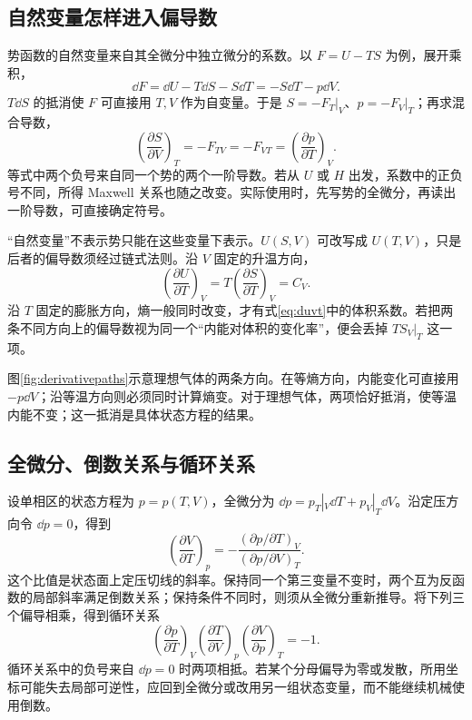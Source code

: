 \subsection{自然变量怎样进入偏导数}
\label{th:naturalderivatives}
势函数的自然变量来自其全微分中独立微分的系数。以 $F=U-TS$ 为例，展开乘积，
\[
 \dd F=\dd U-T\dd S-S\dd T
 =-S\dd T-p\dd V.
\]
$T\dd S$ 的抵消使 $F$ 可直接用 $T,V$ 作为自变量。于是
$S=-F_T|_V$、$p=-F_V|_T$；再求混合导数，
\[
 \left(\frac{\partial S}{\partial V}\right)_T
 =-F_{TV}
 =-F_{VT}
 =\left(\frac{\partial p}{\partial T}\right)_V.
\]
等式中两个负号来自同一个势的两个一阶导数。若从 $U$ 或 $H$ 出发，系数中的正负号不同，所得 Maxwell 关系也随之改变。实际使用时，先写势的全微分，再读出一阶导数，可直接确定符号。

“自然变量”不表示势只能在这些变量下表示。$U(S,V)$ 可改写成 $U(T,V)$，只是后者的偏导数须经过链式法则。沿 $V$ 固定的升温方向，
\[
 \left(\frac{\partial U}{\partial T}\right)_V
 =T\left(\frac{\partial S}{\partial T}\right)_V=C_V.
\]
沿 $T$ 固定的膨胀方向，熵一般同时改变，才有式\eqref{eq:duvt}中的体积系数。若把两条不同方向上的偏导数视为同一个“内能对体积的变化率”，便会丢掉 $T S_V|_T$ 这一项。

图\ref{fig:derivativepaths}示意理想气体的两条方向。在等熵方向，内能变化可直接用 $-p\dd V$；沿等温方向则必须同时计算熵变。对于理想气体，两项恰好抵消，使等温内能不变；这一抵消是具体状态方程的结果。

\subsection{全微分、倒数关系与循环关系}
设单相区的状态方程为 $p=p(T,V)$，全微分为
$\dd p=p_T|_V\dd T+p_V|_T\dd V$。沿定压方向令 $\dd p=0$，得到
\[
 \left(\frac{\partial V}{\partial T}\right)_p
 =-\frac{(\partial p/\partial T)_V}
 {(\partial p/\partial V)_T}.
\]
这个比值是状态面上定压切线的斜率。保持同一个第三变量不变时，两个互为反函数的局部斜率满足倒数关系；保持条件不同时，则须从全微分重新推导。将下列三个偏导相乘，得到循环关系
\[
 \left(\frac{\partial p}{\partial T}\right)_V
 \left(\frac{\partial T}{\partial V}\right)_p
 \left(\frac{\partial V}{\partial p}\right)_T=-1.
\]
循环关系中的负号来自 $\dd p=0$ 时两项相抵。若某个分母偏导为零或发散，所用坐标可能失去局部可逆性，应回到全微分或改用另一组状态变量，而不能继续机械使用倒数。

